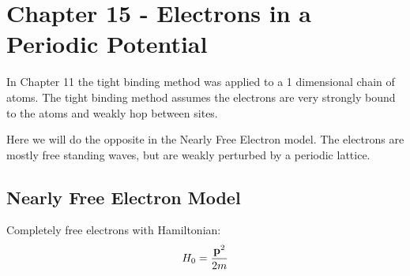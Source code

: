 \section{Chapter 15 - Electrons in a Periodic Potential} 
	In Chapter 11 the tight binding method was applied to a 1 dimensional chain of atoms.  The tight binding method assumes the electrons are very strongly bound to the atoms and weakly hop between sites.  
	
	Here we will do the opposite in the Nearly Free Electron model.  The electrons are mostly free standing waves, but are weakly perturbed by a periodic lattice.
	\subsection{Nearly Free Electron Model}
		Completely free electrons with Hamiltonian:
			\begin{equation}
				H_0 = \frac{\textrm{\textbf{p}}^2}{2m}
			\end{equation}
			